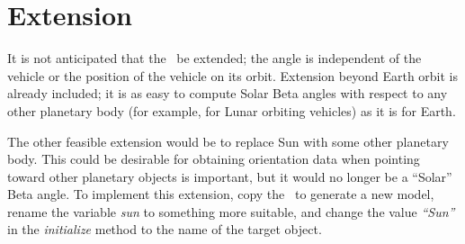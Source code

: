 %
%
% 
%

 \section{Extension}

It is not anticipated that the \SolarBetaDesc\ be extended; the angle is independent of the vehicle or the position of the vehicle on its orbit.  Extension beyond Earth orbit is already included; it is as easy to compute Solar Beta angles with respect to any other planetary body (for example, for Lunar orbiting vehicles) as it is for Earth.  

The other feasible extension would be to replace Sun with some other planetary body.  This could be desirable for obtaining orientation data when pointing toward other planetary objects is important, but it would no longer be a ``Solar'' Beta angle.  To implement this extension, copy the \SolarBetaDesc\ to generate a new model, rename the variable \textit{sun} to something more suitable, and change the value \textit{``Sun''} in the \textit{initialize} method to the name of the target object.